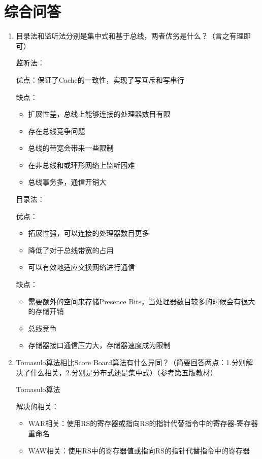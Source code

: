 \documentclass{ctexart}
\begin{document}
\section{\hei 综合问答}
\begin{enumerate}
    \item 目录法和监听法分别是集中式和基于总线，两者优劣是什么？（言之有理即可）
    \par 监听法：
    \par \quad 优点：保证了Cache的一致性，实现了写互斥和写串行
    \par \quad 缺点：\begin{itemize}
        \item 扩展性差，总线上能够连接的处理器数目有限
        \item 存在总线竞争问题
        \item 总线的带宽会带来一些限制
        \item 在非总线和或环形网络上监听困难
        \item 总线事务多，通信开销大
    \end{itemize}
    \par 目录法：
    \par \quad 优点：\begin{itemize}
        \item 拓展性强，可以连接的处理器数目更多 
        \item 降低了对于总线带宽的占用
        \item 可以有效地适应交换网络进行通信
    \end{itemize}
    \par \quad 缺点：\begin{itemize}
        \item 需要额外的空间来存储Presence Bits，当处理器数目较多的时候会有很大的存储开销
        \item 总线竞争
        \item 存储器接口通信压力大，存储器速度成为限制
    \end{itemize}
    \item Tomasulo算法相比Score Board算法有什么异同？（简要回答两点：1.分别解决了什么相关，2.分别是分布式还是集中式）（参考第五版教材）
    \par Tomasulo算法
    \par \quad 解决的相关：
    \begin{itemize}
        \item WAR相关：使用RS的寄存器或指向RS的指针代替指令中的寄存器-寄存器重命名
        \item WAW相关：使用RS中的寄存器值或指向RS的指针代替指令中的寄存器

\end{itemize}
\end{enumerate}
\end{document}
